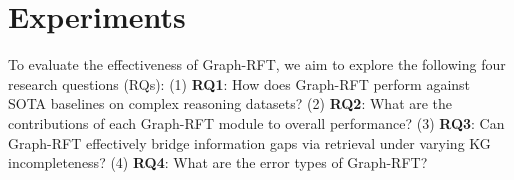 \documentclass[sigconf]{acmart}
\begin{document}
\section{Experiments}
To evaluate the effectiveness of Graph-RFT, we aim to explore the following four research questions (RQs):
(1) \textbf{RQ1}: How does Graph-RFT perform against SOTA baselines on complex reasoning datasets?
(2) \textbf{RQ2}: What are the contributions of each  Graph-RFT module to overall performance?
(3) \textbf{RQ3}: Can Graph-RFT effectively bridge information gaps via retrieval under varying KG incompleteness?
(4) \textbf{RQ4}: What are the error types of Graph-RFT?
\end{document}
